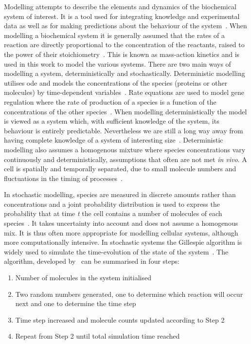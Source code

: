 Modelling attempts to describe the elements and dynamics of the biochemical system of interest. It is a tool used for integrating knowledge and experimental data as well as for making predictions about the behaviour of the system~\autocite{wilkinson:2006}. When modelling a biochemical system it is generally assumed that the rates of a reaction are directly proportional to the concentration of the reactants, raised to the power of their stoichiometry~\autocite{wilkinson:2006}. This is known as mass-action kinetics and is used in this work to model the various systems.  
There are two main ways of modelling a system, deterministically and stochastically. Deterministic modelling utilises \acrfull{ode} and models the concentrations of the species (proteins or other molecules) by time-dependent variables~\autocite{deJong:2002ft}. Rate equations are used to model gene regulation where the rate of production of a species is a function of the concentrations of the other species~\autocite{deJong:2002ft}. When modelling deterministically the model is viewed as a system which, with sufficient knowledge of the system, its behaviour is entirely predictable. Nevertheless we are still a long way away from having complete knowledge of a system of interesting size~\autocite{wilkinson:2006}. Deterministic modelling also assumes a homogenous mixture where species concentrations vary continuously and deterministically, assumptions that often are not met \textit{in vivo}. A cell is spatially and temporally separated, due to small molecule numbers and fluctuations in the timing of processes~\autocite{deJong:2002ft}.  
   
In stochastic modelling, species are measured in discrete amounts rather than concentrations and a joint probability distribution is used to express the probability that at time \textit{t} the cell contains a number of molecules of each species~\autocite{deJong:2002ft}. It takes uncertainty into account and does not assume a homogenous mix. It is thus often more appropriate for modelling cellular systems, although more computationally intensive. In stochastic systems the Gillespie algorithm is widely used to simulate the time-evolution of the state of the system~\autocite{wilkinson:2006}. The algorithm, developed by~\textcite{Gillespie:1977ww} can be summarised in four steps:
\begin{enumerate}
\item Number of molecules in the system initialised
\item Two random numbers generated, one to determine which reaction will occur next and one to determine the time step
\item Time step increased and molecule counts updated according to Step 2 
\item Repeat from Step 2 until total simulation time reached
\end{enumerate}
   
